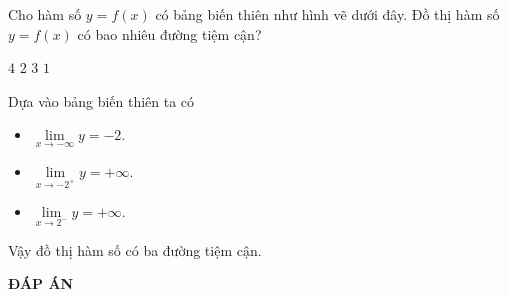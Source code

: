 \begin{ex}%
	Cho hàm số $y=f(x)$ có bảng biến thiên như hình vẽ dưới đây. Đồ thị hàm số $y=f(x)$ có bao nhiêu đường tiệm cận?
	\begin{center}
	\end{center}
	\choice
	{$4$}
	{$2$}
	{\True $3$}
	{$1$}
	\loigiai
	{
		Dựa vào bảng biến thiên ta có
		\begin{itemize}
			\item $\lim\limits_{x \to -\infty} y=-2$.
			\item $\lim\limits_{x \to -2^+} y=+\infty$.
			\item $\lim\limits_{x \to 2^-} y=+\infty$.
		\end{itemize}
		Vậy đồ thị hàm số có ba đường tiệm cận.
	}
\end{ex}

\newpage
\begin{center}
	\textbf{ĐÁP ÁN}
\end{center}
\begin{multicols}{10}
	 
\end{multicols}